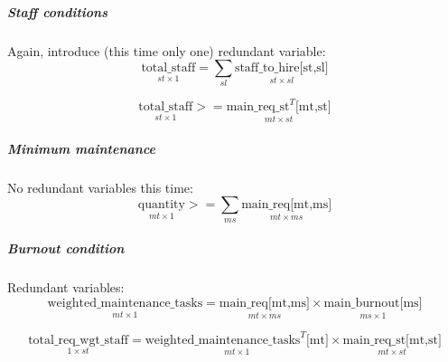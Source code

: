         \subparagraph{Staff conditions} \label{staff condition} \text{} \newline
        \hspace*{.5cm}Again, introduce (this time only one) redundant variable:
        \begin{equation}
            \underset{st\times 1}{\text{total\_staff}} = 
                \sum_{sl}\underset{st\times sl}{\text{staff\_to\_hire[st,sl]}}
        \end{equation}

        \begin{equation}\label{staffeq}
            \underset{st\times 1}{\text{total\_staff}} >= 
                \underset{mt\times st}{\text{main\_req\_st}^T\text{[mt,st]}}
        \end{equation}

        \subparagraph{Minimum maintenance} \label{minimum maintenance} \text{} \newline
        \hspace*{.5cm}No redundant variables this time:
        \begin{equation}\label{maineq}
            \underset{mt\times 1}{\text{quantity}} >= 
                \sum_{ms}\underset{mt\times ms}{\text{main\_req[mt,ms]}}
        \end{equation}

        \subparagraph{Burnout condition} \label{burnout condition} \text{} \newline
        \hspace*{.5cm}Redundant variables:
        \begin{equation}\label{burnouteq}
            \underset{mt\times 1}{\text{weighted\_maintenance\_tasks}} =  
                \underset{mt\times ms}{\text{main\_req[mt,ms]}}\times \underset{ms\times 1}{\text{main\_burnout[ms]}}
        \end{equation}

        \begin{equation}
            \underset{1\times st}{\text{total\_req\_wgt\_staff}} =  
                \underset{mt\times 1}{{\text{weighted\_maintenance\_tasks}^T\text{[mt]}}}\times \underset{mt\times st}{\text{main\_req\_st[mt,st]}}
        \end{equation}

